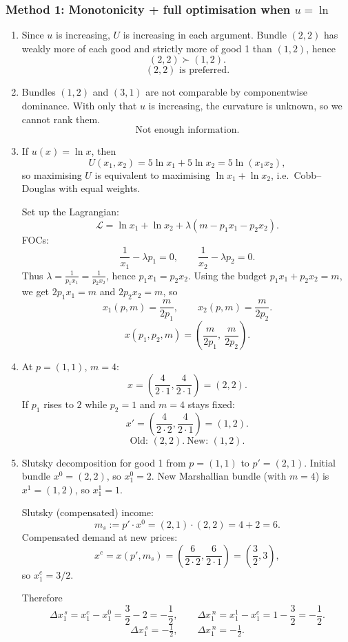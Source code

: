 \documentclass[12pt]{article}
\newcommand{\dotp}{\cdot}
\begin{document}
\subsubsection*{Method 1: Monotonicity + full optimisation when \(u=\ln\)}
\begin{enumerate}[label=(\alph*), leftmargin=*]
\item Since \(u\) is increasing, \(U\) is increasing in each argument. Bundle \((2,2)\) has weakly more of each good and strictly more of good 1 than \((1,2)\), hence
\[
(2,2)\succ (1,2).
\]
\[
\boxed{(2,2)\text{ is preferred.}}
\]

\item Bundles \((1,2)\) and \((3,1)\) are not comparable by componentwise dominance. With only that \(u\) is increasing, the curvature is unknown, so we cannot rank them.
\[
\boxed{\text{Not enough information.}}
\]

\item If \(u(x)=\ln x\), then
\[
U(x_1,x_2)=5\ln x_1+5\ln x_2 = 5\ln(x_1x_2),
\]
so maximising \(U\) is equivalent to maximising \(\ln x_1+\ln x_2\), i.e.\ Cobb--Douglas with equal weights.

Set up the Lagrangian:
\[
\mathcal{L}=\ln x_1+\ln x_2+\lambda(m-p_1x_1-p_2x_2).
\]
FOCs:
\[
\frac{1}{x_1}-\lambda p_1=0,\qquad \frac{1}{x_2}-\lambda p_2=0.
\]
Thus \(\lambda=\frac{1}{p_1x_1}=\frac{1}{p_2x_2}\), hence \(p_1x_1=p_2x_2\).
Using the budget \(p_1x_1+p_2x_2=m\), we get \(2p_1x_1=m\) and \(2p_2x_2=m\), so
\[
x_1(p,m)=\frac{m}{2p_1},\qquad x_2(p,m)=\frac{m}{2p_2}.
\]
\[
\boxed{x(p_1,p_2,m)=\left(\dfrac{m}{2p_1},\ \dfrac{m}{2p_2}\right).}
\]

\item At \(p=(1,1)\), \(m=4\):
\[
x=\left(\frac{4}{2\cdot 1},\frac{4}{2\cdot 1}\right)=(2,2).
\]
If \(p_1\) rises to \(2\) while \(p_2=1\) and \(m=4\) stays fixed:
\[
x'=\left(\frac{4}{2\cdot 2},\frac{4}{2\cdot 1}\right)=(1,2).
\]
\[
\boxed{\text{Old: }(2,2).\ \text{New: }(1,2).}
\]

\item Slutsky decomposition for good 1 from \(p=(1,1)\) to \(p'=(2,1)\).
Initial bundle \(x^0=(2,2)\), so \(x_1^0=2\).
New Marshallian bundle (with \(m=4\)) is \(x^1=(1,2)\), so \(x_1^1=1\).

Slutsky (compensated) income:
\[
m_s:=p'\dotp x^0 = (2,1)\dotp(2,2)=4+2=6.
\]
Compensated demand at new prices:
\[
x^c=x(p',m_s)=\left(\frac{6}{2\cdot 2},\frac{6}{2\cdot 1}\right)=\left(\frac{3}{2},3\right),
\]
so \(x_1^c=3/2\).

Therefore
\[
\Delta x_1^{\,s}=x_1^c-x_1^0=\frac{3}{2}-2=-\frac{1}{2},
\qquad
\Delta x_1^{\,n}=x_1^1-x_1^c=1-\frac{3}{2}=-\frac{1}{2}.
\]
\[
\boxed{\Delta x_1^{\,s}=-\tfrac12,\qquad \Delta x_1^{\,n}=-\tfrac12.}
\]
\end{enumerate}
\end{document}
